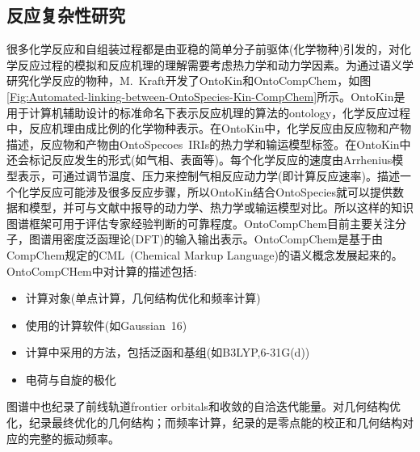 \subsection{反应复杂性研究}
很多化学反应和自组装过程都是由亚稳的简单分子前驱体(化学物种)引发的，对化学反应过程的模拟和反应机理的理解需要考虑热力学和动力学因素。为通过语义学研究化学反应的物种，\textrm{M.~Kraft}开发了\textrm{OntoKin}和\textrm{OntoCompChem}，如图\ref{Fig:Automated-linking-between-OntoSpecies-Kin-CompChem}所示。\textrm{OntoKin}是用于计算机辅助设计的标准命名下表示反应机理的算法的\textrm{ontology}，化学反应过程中，反应机理由成比例的化学物种表示。在\textrm{OntoKin}中，化学反应由反应物和产物描述，反应物和产物由\textrm{OntoSpecoes~IRIs}的热力学和输运模型标签。在\textrm{OntoKin}中还会标记反应发生的形式(如气相、表面等)。每个化学反应的速度由\textrm{Arrhenius}模型表示，可通过调节温度、压力来控制气相反应动力学(即计算反应速率)。描述一个化学反应可能涉及很多反应步骤，所以\textrm{OntoKin}结合\textrm{OntoSpecies}就可以提供数据和模型，并可与文献中报导的动力学、热力学或输运模型对比。所以这样的知识图谱框架可用于评估专家经验判断的可靠程度。\textrm{OntoCompChem}目前主要关注分子，图谱用密度泛函理论\textrm{(DFT)}的输入输出表示。\textrm{OntoCompChem}是基于由\textrm{CompChem}规定的\textrm{CML~(Chemical Markup Language)}的语义概念发展起来的。\textrm{OntoCompCHem}中对计算的描述包括:
\begin{itemize}
	\item 计算对象(单点计算，几何结构优化和频率计算)
	\item 使用的计算软件(如\textrm{Gaussian~16})
	\item 计算中采用的方法，包括泛函和基组(如\textrm{B3LYP,6-31G(d)})
	\item 电荷与自旋的极化
\end{itemize}
图谱中也纪录了前线轨道\textrm{frontier orbitals}和收敛的自洽迭代能量。对几何结构优化，纪录最终优化的几何结构；而频率计算，纪录的是零点能的校正和几何结构对应的完整的振动频率。


